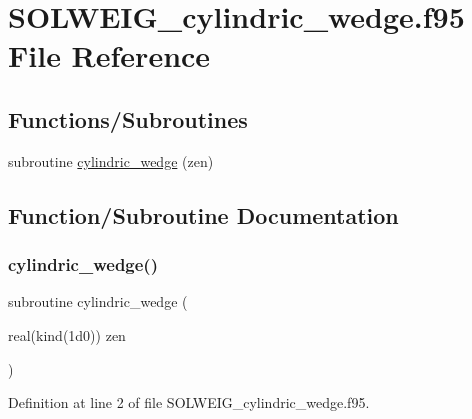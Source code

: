 \hypertarget{_s_o_l_w_e_i_g__cylindric__wedge_8f95}{}\section{S\+O\+L\+W\+E\+I\+G\+\_\+cylindric\+\_\+wedge.\+f95 File Reference}
\label{_s_o_l_w_e_i_g__cylindric__wedge_8f95}
\subsection*{Functions/\+Subroutines}
\begin{DoxyCompactItemize}
\item 
subroutine \hyperlink{_s_o_l_w_e_i_g__cylindric__wedge_8f95_adecf9b94909b1f587fda42045ec08188}{cylindric\+\_\+wedge} (zen)
\end{DoxyCompactItemize}


\subsection{Function/\+Subroutine Documentation}
\mbox{\label{_s_o_l_w_e_i_g__cylindric__wedge_8f95_adecf9b94909b1f587fda42045ec08188}} 
\subsubsection{\texorpdfstring{cylindric\+\_\+wedge()}{cylindric\_wedge()}}
{\footnotesize\ttfamily subroutine cylindric\+\_\+wedge (\begin{DoxyParamCaption}\item[{real(kind(1d0))}]{zen }\end{DoxyParamCaption})}



Definition at line 2 of file S\+O\+L\+W\+E\+I\+G\+\_\+cylindric\+\_\+wedge.\+f95.

